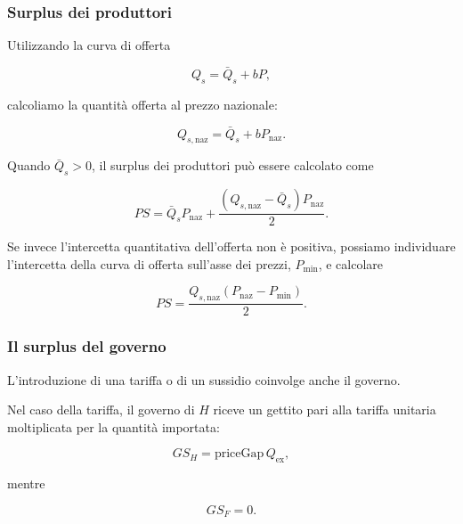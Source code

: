 \subsubsection{Surplus dei produttori}

Utilizzando la curva di offerta

\begin{equation*}
    Q_s=\bar Q_s+bP,
\end{equation*}

calcoliamo la quantità offerta al prezzo nazionale:

\begin{equation*}
    Q_{s,\mathrm{naz}}
    =
    \bar Q_s+bP_{\mathrm{naz}}.
\end{equation*}

Quando $\bar Q_s>0$, il surplus dei produttori può essere
calcolato come

\begin{equation*}
    PS
    =
    \bar Q_s P_{\mathrm{naz}}
    +
    \frac{
        \left(Q_{s,\mathrm{naz}}-\bar Q_s\right)
        P_{\mathrm{naz}}
    }{2}.
    \label{eq:producer-surplus-positive-intercept}
\end{equation*}

Se invece l'intercetta quantitativa dell'offerta non è positiva,
possiamo individuare l'intercetta della curva di offerta sull'asse
dei prezzi, $P_{\min}$, e calcolare

\begin{equation*}
    PS
    =
    \frac{
        Q_{s,\mathrm{naz}}
        \left(P_{\mathrm{naz}}-P_{\min}\right)
    }{2}.
    \label{eq:producer-surplus-negative-intercept}
\end{equation*}


\subsubsection{Il surplus del governo}

L'introduzione di una tariffa o di un sussidio coinvolge anche il
governo.

Nel caso della tariffa, il governo di $H$ riceve un gettito pari
alla tariffa unitaria moltiplicata per la quantità importata:

\begin{equation*}
    GS_H
    =
    \mathrm{priceGap}\,Q_{\mathrm{ex}},
\end{equation*}

mentre

\begin{equation*}
    GS_F=0.
\end{equation*}

